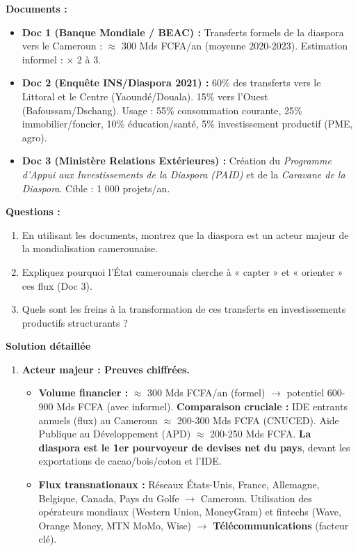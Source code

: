 \documentclass[11pt]{article}
\begin{document}
\begin{exoresolu}
\textbf{Documents :}
\begin{itemize}
    \item \textbf{Doc 1 (Banque Mondiale / BEAC) :} Transferts formels de la diaspora vers le Cameroun : $\approx$ 300 Mds FCFA/an (moyenne 2020-2023). Estimation informel : $\times$ 2 à 3.
    \item \textbf{Doc 2 (Enquête INS/Diaspora 2021) :} 60\% des transferts vers le Littoral et le Centre (Yaoundé/Douala). 15\% vers l'Ouest (Bafoussam/Dschang). Usage : 55\% consommation courante, 25\% immobilier/foncier, 10\% éducation/santé, 5\% investissement productif (PME, agro).
    \item \textbf{Doc 3 (Ministère Relations Extérieures) :} Création du \emph{Programme d'Appui aux Investissements de la Diaspora (PAID)} et de la \emph{Caravane de la Diaspora}. Cible : 1 000 projets/an.
\end{itemize}
\textbf{Questions :}
\begin{enumerate}
    \item En utilisant les documents, montrez que la diaspora est un acteur majeur de la mondialisation camerounaise.
    \item Expliquez pourquoi l'État camerounais cherche à « capter » et « orienter » ces flux (Doc 3).
    \item Quels sont les freins à la transformation de ces transferts en investissements productifs structurants ?
\end{enumerate}
\tcblower
\textbf{Solution détaillée}
\begin{enumerate}
    \item \textbf{Acteur majeur : Preuves chiffrées.}
    \begin{itemize}
        \item \textbf{Volume financier :} $\approx$ 300 Mds FCFA/an (formel) $\rightarrow$ potentiel 600-900 Mds FCFA (avec informel). \textbf{Comparaison cruciale :} IDE entrants annuels (flux) au Cameroun $\approx$ 200-300 Mds FCFA (CNUCED). Aide Publique au Développement (APD) $\approx$ 200-250 Mds FCFA. \textbf{La diaspora est le 1er pourvoyeur de devises net du pays}, devant les exportations de cacao/bois/coton et l'IDE.
        \item \textbf{Flux transnationaux :} Réseaux États-Unis, France, Allemagne, Belgique, Canada, Pays du Golfe $\rightarrow$ Cameroun. Utilisation des opérateurs mondiaux (Western Union, MoneyGram) et fintechs (Wave, Orange Money, MTN MoMo, Wise) $\rightarrow$ \textbf{Télécommunications} (facteur clé).

\end{itemize}
\end{enumerate}
\end{exoresolu}
\end{document}
